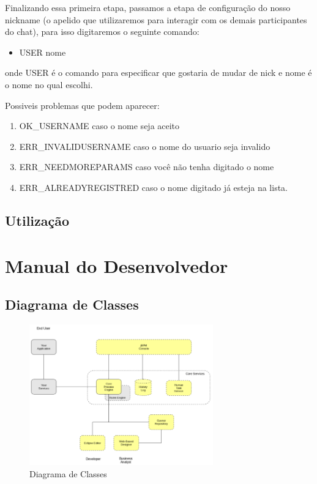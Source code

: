 \documentclass{abnt}
\begin{document}
	Finalizando essa primeira etapa, passamos a etapa de configuração do nosso nickname (o apelido que utilizaremos para interagir com os demais participantes do chat), para isso digitaremos o seguinte comando:
	\begin{itemize}
		\item USER nome	
	\end{itemize}
	onde USER é o comando para especificar que gostaria de mudar de nick e nome é o nome no qual escolhi.

	Possiveis problemas que podem aparecer:
	\begin{enumerate}
		
		\item OK_USERNAME caso o nome seja aceito
		\item ERR_INVALIDUSERNAME caso o nome do usuario seja invalido
		\item ERR_NEEDMOREPARAMS caso você não tenha digitado o nome
		\item ERR_ALREADYREGISTRED caso o nome digitado já esteja na lista.	
		
	\end{enumerate}
	
	\section{Utilização}		
		


\clearpage
\chapter{Manual do Desenvolvedor}
	\section{Diagrama de Classes}	
	
	\begin{figure}[htp]
		\begin{center}
			\includegraphics[width=300px]{jbpm_overview}
			\caption{Diagrama de Classes}
			\label{fig:jbpmOverview}
		\end{center}
	\end{figure}
	\FloatBarrier
	
\end{document}
